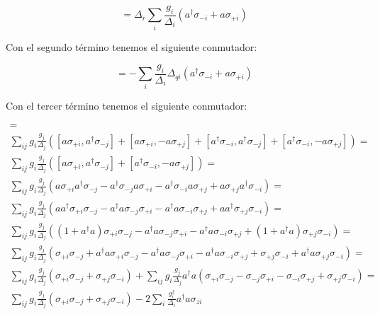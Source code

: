 \begin{equation}
    [\Delta_r a^\dagger a, \sum\limits_i \frac{g_i} {\Delta_i} (a^\dagger \sigma_{-i} - a \sigma_{+i})] = \Delta_r \sum\limits_i \frac{g_i} {\Delta_i} (a^\dagger \sigma_{-i} + a \sigma_{+i})
\end{equation}

Con el segundo término tenemos el siguiente conmutador:

\begin{equation}
    [- \frac{1}{2} \sum\limits_i \Delta_{qi} \sigma_{zi}, \sum\limits_i \frac{g_i} {\Delta_i} (a^\dagger \sigma_{-i} - a \sigma_{+i})] = - \sum\limits_i \frac{g_i} {\Delta_i} \Delta_{qi} (a^\dagger \sigma_{-i} + a \sigma_{+i})
\end{equation}

Con el tercer término tenemos el siguiente conmutador:

\begin{multline}
[\sum\limits_i g_i (a \sigma_{+i} + a^\dagger \sigma_{-i}), \sum\limits_j \frac{g_j} {\Delta_j} (a^\dagger \sigma_{-j} - a \sigma_{+j})] = \\
\sum\limits_{ij} g_i \frac{g_j}{\Delta_j} \left([ a \sigma_{+i}, a^\dagger \sigma_{-j}] +
[a \sigma_{+i}, - a \sigma_{+j}] +
[a^\dagger \sigma_{-i}, a^\dagger \sigma_{-j}] +
[a^\dagger \sigma_{-i}, - a \sigma_{+j}]\right) =\\
\sum\limits_{ij} g_i \frac{g_j}{\Delta_j} \left([ a \sigma_{+i}, a^\dagger \sigma_{-j}] +
[a^\dagger \sigma_{-i}, - a \sigma_{+j}]\right) =\\
\sum\limits_{ij} g_i \frac{g_j}{\Delta_j} \left(
    a \sigma_{+i} a^\dagger \sigma_{-j} - a^\dagger \sigma_{-j} a \sigma_{+i}
    - a^\dagger \sigma_{-i} a \sigma_{+j} + a \sigma_{+j} a^\dagger \sigma_{-i}\right) =\\
\sum\limits_{ij} g_i \frac{g_j}{\Delta_j} \left(
    a a^\dagger \sigma_{+i} \sigma_{-j} - a^\dagger a \sigma_{-j} \sigma_{+i}
    - a^\dagger a \sigma_{-i} \sigma_{+j} + a a^\dagger \sigma_{+j} \sigma_{-i}\right) =\\
\sum\limits_{ij} g_i \frac{g_j}{\Delta_j} \left(
    (1 + a^\dagger a) \sigma_{+i} \sigma_{-j} - a^\dagger a \sigma_{-j} \sigma_{+i}
    - a^\dagger a \sigma_{-i} \sigma_{+j} + (1 + a^\dagger a) \sigma_{+j} \sigma_{-i}\right) =\\
\sum\limits_{ij} g_i \frac{g_j}{\Delta_j} \left(
    \sigma_{+i} \sigma_{-j} + a^\dagger a \sigma_{+i} \sigma_{-j} - a^\dagger a \sigma_{-j} \sigma_{+i}
    - a^\dagger a \sigma_{-i} \sigma_{+j} + \sigma_{+j} \sigma_{-i} + a^\dagger a \sigma_{+j} \sigma_{-i}\right) =\\
\sum\limits_{ij} g_i \frac{g_j}{\Delta_j} \left(\sigma_{+i} \sigma_{-j} + \sigma_{+j} \sigma_{-i}\right) +
\sum\limits_{ij} g_i \frac{g_j}{\Delta_j} a^\dagger a \left(
    \sigma_{+i} \sigma_{-j} - \sigma_{-j} \sigma_{+i}
    - \sigma_{-i} \sigma_{+j} + \sigma_{+j} \sigma_{-i}\right) =\\
\sum\limits_{ij} g_i \frac{g_j}{\Delta_j} \left(\sigma_{+i} \sigma_{-j} + \sigma_{+j} \sigma_{-i}\right) -
2 \sum\limits_{i} \frac{g_i^2}{\Delta_i} a^\dagger a \sigma_{zi}
\end{multline}

